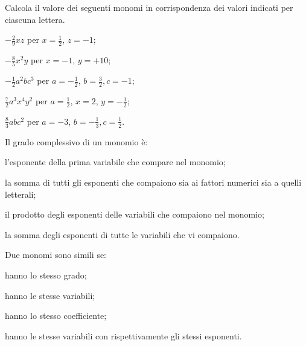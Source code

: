 \begin{esercizio}
 \label{ese:10.4} %
 Calcola il valore dei seguenti monomi in corrispondenza dei valori indicati per ciascuna lettera.

\begin{multicols}{2}
\begin{enumeratea}
 \item $-\frac{2}{9}xz$ per $ x=\frac{1}{2} $, $z=-1$;
 \item $-\frac{8}{5}x^{2}y$ per $ x=-1 $, $y=+10$;
 \item $-\frac{1}{2}a^{2}bc^3$ per $ a=-\frac{1}{2} $, $b=\frac{3}{2},c=-1$;
 \item $\frac{7}{2}a^{3}x^{4}y^2$ per $ a=\frac{1}{2} $, $x=2$, $y=-\frac{1}{2}$;
 \item $\frac{8}{3}abc^2$ per $ a=-3 $, $b=-\frac{1}{3},c=\frac{1}{2}$.
\end{enumeratea}
\end{multicols}
\end{esercizio}


\begin{esercizio}
 \label{ese:10.5} %
 Il grado complessivo di un monomio è:

\begin{enumeratea}
 \item l'esponente della prima variabile che compare nel monomio;
 \item la somma di tutti gli esponenti che compaiono sia ai fattori
numerici sia a quelli letterali;
 \item il prodotto degli esponenti delle variabili che compaiono nel monomio;
 \item la somma degli esponenti di tutte le variabili che vi compaiono.
\end{enumeratea}
\end{esercizio}


\begin{esercizio}
 \label{ese:10.6} %
Due monomi sono simili se:

\begin{enumeratea}
 \item hanno lo stesso grado;
 \item hanno le stesse variabili;
 \item hanno lo stesso coefficiente;
 \item hanno le stesse variabili con rispettivamente gli stessi esponenti.
\end{enumeratea}
\end{esercizio}


